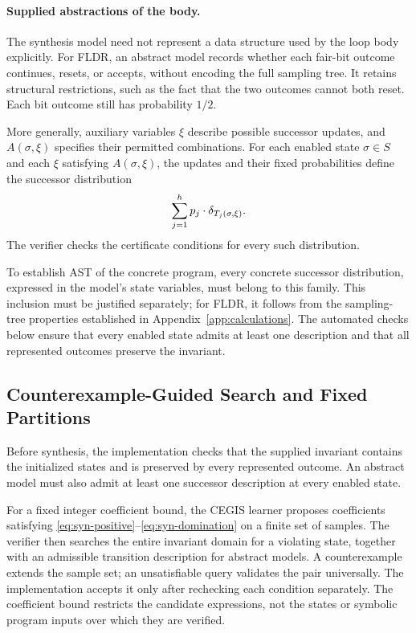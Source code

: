 \paragraph{Supplied abstractions of the body.}
The synthesis model need not represent a data structure used by the
loop body explicitly. For FLDR, an abstract model records whether
each fair-bit outcome continues, resets, or accepts, without encoding
the full sampling tree. It retains structural restrictions, such as
the fact that the two outcomes cannot both reset. Each bit outcome
still has probability $1/2$.

More generally, auxiliary variables $\xi$ describe possible successor
updates, and $A(\sigma,\xi)$ specifies their permitted combinations.
For each enabled state $\sigma\in S$ and each $\xi$ satisfying
$A(\sigma,\xi)$, the updates and their fixed probabilities define
the successor distribution
\[
 \sum_{j=1}^{h}p_j\cdot\delta_{T_j(\sigma,\xi)}.
\]
The verifier checks the certificate conditions for every such
distribution.

To establish AST of the concrete program, every concrete successor
distribution, expressed in the model's state variables, must belong
to this family. This inclusion must be justified separately;
for FLDR, it follows from the sampling-tree properties established
in Appendix~\ref{app:calculations}.
The automated checks below ensure that every enabled state admits
at least one description and that all represented outcomes preserve
the invariant.

\subsection{Counterexample-Guided Search and Fixed Partitions}
\label{sec:synthesis-cegis}

Before synthesis, the implementation checks that the supplied invariant
contains the initialized states and is preserved by every represented
outcome. An abstract model must also admit at least one successor
description at every enabled state.

For a fixed integer coefficient bound, the CEGIS learner proposes
coefficients satisfying \eqref{eq:syn-positive}--\eqref{eq:syn-domination}
on a finite set of samples. The verifier then searches the entire
invariant domain for a violating state, together with an admissible
transition description for abstract models. A counterexample extends the
sample set; an unsatisfiable query validates the pair universally.
The implementation accepts it only after rechecking each condition
separately. The coefficient bound restricts the candidate expressions,
not the states or symbolic program inputs over which they are verified.

